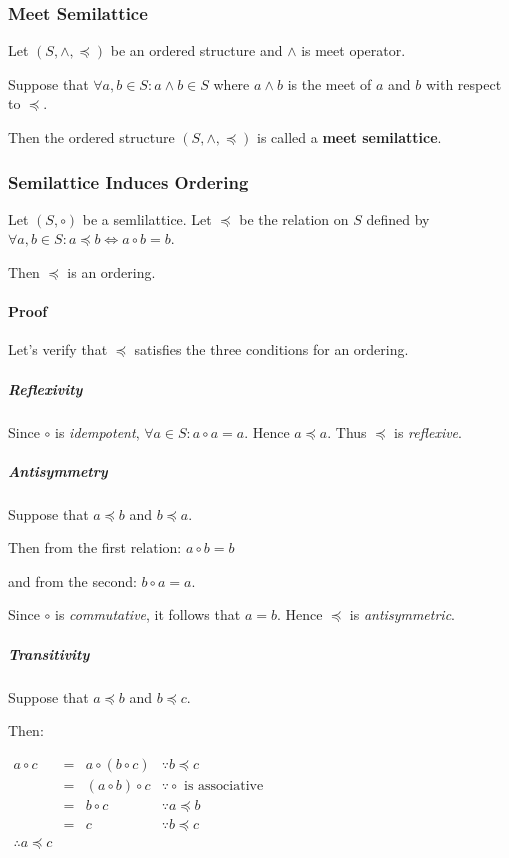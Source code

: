 \subsubsection{Meet Semilattice}
Let $(S, \wedge, \preceq)$ be an ordered structure and $\wedge$ is meet
operator.

Suppose that $\forall a, b \in S: a \wedge b \in S$ where $a \wedge b$ is
the meet of $a$ and $b$ with respect to $\preceq$.

Then the ordered structure $(S, \wedge, \preceq)$ is called a
\textbf{meet semilattice}.


\subsubsection{Semilattice Induces Ordering}
\label{sec:semilattice-induces-ordering}

Let $(S, \circ)$ be a semlilattice. Let $\preceq$ be the relation on
$S$ defined by $\forall a, b \in S: a \preceq b \iff a \circ b = b$.

Then $\preceq$ is an ordering.

\paragraph{Proof}

Let's verify that $\preceq$ satisfies the three conditions for an
ordering.

\subparagraph{Reflexivity}

Since $\circ$ is \textit{idempotent},
$\forall a \in S: a \circ a = a$. Hence $a \preceq a$. Thus $\preceq$
is \textit{reflexive}.

\subparagraph{Antisymmetry}

Suppose that $a \preceq b$ and $b \preceq a$.

Then from the first relation: $a \circ b = b$

and from the second: $b \circ a =a$.

Since $\circ$ is \textit{commutative}, it follows that $a = b$. Hence
$\preceq$ is \textit{antisymmetric}.

\subparagraph{Transitivity}

Suppose that $a \preceq b$ and $b \preceq c$.

Then:

\begin{math}
  \begin{array}{lcll}
    a \circ c & = & a \circ (b \circ c) & \because b \preceq c \\
              & = & (a \circ b) \circ c & \because \circ \text{ is associative} \\
              & = & b \circ c & \because a \preceq b \\
              & = & c & \because b \preceq c \\
    \therefore a \preceq c
  \end{array}
\end{math}

